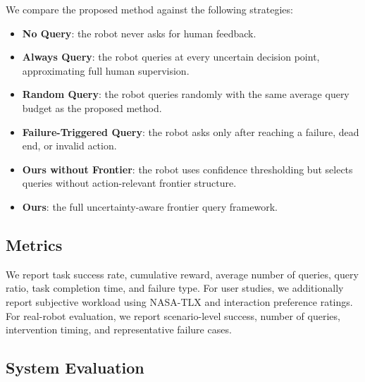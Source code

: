 We compare the proposed method against the following strategies:
\begin{itemize}[leftmargin=*]
    \item \textbf{No Query}: the robot never asks for human feedback.
    \item \textbf{Always Query}: the robot queries at every uncertain decision point, approximating full human supervision.
    \item \textbf{Random Query}: the robot queries randomly with the same average query budget as the proposed method.
    \item \textbf{Failure-Triggered Query}: the robot asks only after reaching a failure, dead end, or invalid action.
    \item \textbf{Ours without Frontier}: the robot uses confidence thresholding but selects queries without action-relevant frontier structure.
    \item \textbf{Ours}: the full uncertainty-aware frontier query framework.
\end{itemize}

\subsection{Metrics}

We report task success rate, cumulative reward, average number of queries, query ratio, task completion time, and failure type. For user studies, we additionally report subjective workload using NASA-TLX and interaction preference ratings. For real-robot evaluation, we report scenario-level success, number of queries, intervention timing, and representative failure cases.

\subsection{System Evaluation}

